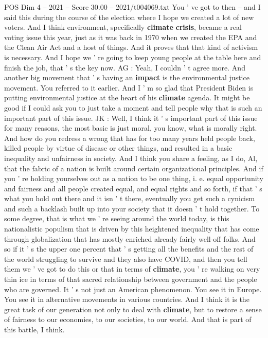 \begin{textsample}{POS Dim 4 – 2021 – Score 30.00 – 2021/t004069.txt}
You ' ve got to then -- and I said this during the course of the election where I hope we created a lot of new voters.
And I think environment, specifically \textbf{climate} \textbf{crisis}, became a real voting issue this year, just as it was back in 1970 when we created the EPA and the Clean Air Act and a host of things.
And it proves that that kind of activism is necessary.
And I hope we ' re going to keep young people at the table here and finish the job, that ' s the key now.
AG : Yeah, I couldn ' t agree more.
And another big movement that ' s having an \textbf{impact} is the environmental justice movement.
You referred to it earlier.
And I ' m so glad that President Biden is putting environmental justice at the heart of his \textbf{climate} agenda.
It might be good if I could ask you to just take a moment and tell people why that is such an important part of this issue.
JK : Well, I think it ' s important part of this issue for many reasons, the most basic is just moral, you know, what is morally right.
And how do you redress a wrong that has for too many years held people back, killed people by virtue of disease or other things, and resulted in a basic inequality and unfairness in society.
And I think you share a feeling, as I do, Al, that the fabric of a nation is built around certain organizational principles.
And if you ' re holding yourselves out as a nation to be one thing, i. e. equal opportunity and fairness and all people created equal, and equal rights and so forth, if that ' s what you hold out there and it isn ' t there, eventually you get such a cynicism and such a backlash built up into your society that it doesn ' t hold together.
To some degree, that is what we ' re seeing around the world today, is this nationalistic populism that is driven by this heightened inequality that has come through globalization that has mostly enriched already fairly well-off folks.
And so if it ' s the upper one percent that ' s getting all the benefits and the rest of the world struggling to survive and they also have COVID, and then you tell them we ' ve got to do this or that in terms of \textbf{climate}, you ' re walking on very thin ice in terms of that sacred relationship between government and the people who are governed.
It ' s not just an American phenomenon.
You see it in Europe.
You see it in alternative movements in various countries.
And I think it is the great task of our generation not only to deal with \textbf{climate}, but to restore a sense of fairness to our economies, to our societies, to our world.
And that is part of this battle, I think.

\end{textsample}
